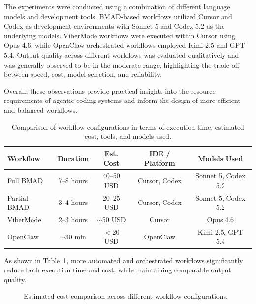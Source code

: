 \documentclass[a4paper,12pt]{report}
\begin{document}
The experiments were conducted using a combination of different language models and development tools. BMAD-based workflows utilized Cursor and Codex as development environments with Sonnet 5 and Codex 5.2 as the underlying models. ViberMode workflows were executed within Cursor using Opus 4.6, while OpenClaw-orchestrated workflows employed Kimi 2.5 and GPT 5.4. Output quality across different workflows was evaluated qualitatively and was generally observed to be in the moderate range, highlighting the trade-off between speed, cost, model selection, and reliability.

Overall, these observations provide practical insights into the resource requirements of agentic coding systems and inform the design of more efficient and balanced workflows.

\begin{table}[h!]
\caption[Workflow comparison]{Comparison of workflow configurations in terms of execution time, estimated cost, tools, and models used.}
\begin{center}
\small
\begin{tabular}{|l|c|c|c|c|} \hline
\textbf{Workflow} & \textbf{Duration} & \textbf{Est. Cost} & \textbf{IDE / Platform} & \textbf{Models Used} \\\hline
Full BMAD & 7--8 hours & 40--50 USD & Cursor, Codex & Sonnet 5, Codex 5.2 \\\hline
Partial BMAD & 3--4 hours & 20--25 USD & Cursor, Codex & Sonnet 5, Codex 5.2 \\\hline
ViberMode & 2--3 hours & $\sim$50 USD & Cursor & Opus 4.6 \\\hline
OpenClaw & $\sim$30 min & $<$20 USD & OpenClaw & Kimi 2.5, GPT 5.4 \\\hline
\end{tabular}
\label{table:workflowComparison}
\end{center}
\end{table}

As shown in Table~\ref{table:workflowComparison}, more automated and orchestrated workflows significantly reduce both execution time and cost, while maintaining comparable output quality.

\begin{figure}[h!]
\centering
{}
\caption{Estimated cost comparison across different workflow configurations.}
\label{fig:costComparison}
\end{figure}
\end{document}

